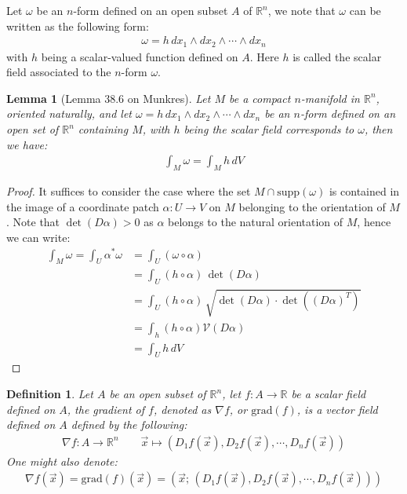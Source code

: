 \documentclass[15pt]{book}
\theoremstyle{break}
\theoremstyle{break}
\newtheorem{lem}{Lemma}[thm]
\newtheorem{defn}{Definition}[corL]
\newcommand{\R}{\mathbb{R}}
\newcommand{\supp}{\text{supp}}
\begin{document}
Let $\omega$ be an $n$-form defined on an open subset $A$ of $\R^n$, we note that $\omega$ can be written as the following form:
\begin{align*}
\omega = h\, dx_1\wedge dx_2 \wedge \cdots \wedge dx_n
\end{align*}
with $h$ being a scalar-valued function defined on $A$. Here $h$ is called the scalar field associated to the $n$-form $\omega$. 

\newpage
\begin{lem}[Lemma 38.6 on Munkres]
Let $M$ be a compact $n$-manifold in $\R^n$, oriented naturally, and let $\omega = h\, dx_1 \wedge dx_2 \wedge \cdots \wedge dx_n$ be an $n$-form defined on an open set of $\R^n$ containing $M$, with $h$ being the scalar field corresponds to $\omega$, then we have:
\begin{align*}
\int_M \omega = \int_M h\, dV
\end{align*} 
\end{lem}
\begin{proof}
It suffices to consider the case where the set $M\cap \supp(\omega)$ is contained in the image of a coordinate patch $\alpha:U \to V$ on $M$ belonging to the orientation of $M$. Note that $\det(D\alpha)>0$ as $\alpha$ belongs to the natural orientation of $M$, hence we can write:
\begin{align*}
\int_M \omega = \int_U \alpha^*\omega &=\int_U (\omega \circ \alpha) \\
&= \int_{U}(h\circ \alpha) \, \det(D\alpha) \\
&=\int_{U}(h\circ \alpha) \, \sqrt{\det(D\alpha)\cdot \det((D\alpha)^T)} \\
&= \int_h (h\circ \alpha) \mathcal{V}(D\alpha) \\
&= \int_U h\, dV  
\end{align*}
\end{proof}

\begin{defn}
Let $A$ be an open subset of $\R^n$, let $f:A \to \R$ be a scalar field defined on $A$, the gradient of $f$, denoted as $\nabla f$, or $\text{grad}(f)$, is a vector field defined on $A$ defined by the following:
\begin{align*}
\nabla f: A \to \R^n \qquad \vec{x}\mapsto (D_1f(\vec{x}), D_2f(\vec{x}),\cdots , D_nf(\vec{x}))
\end{align*}
One might also denote:
\begin{align*}
\nabla f(\vec{x}) = \text{grad}(f)(\vec{x}) = (\vec{x};\, (D_1f(\vec{x}), D_2f(\vec{x}),\cdots , D_nf(\vec{x})))
\end{align*}
\end{defn}
\end{document}
